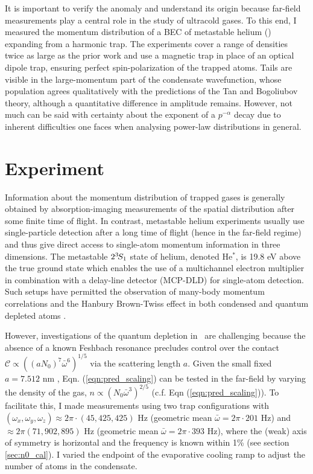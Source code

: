 	It is important to verify the anomaly and understand its origin because far-field measurements play a central role in the study of ultracold gases.
	To this end, I measured the momentum distribution of a BEC of metastable helium (\mhe) expanding from a harmonic trap. 
	The experiments cover a range of densities twice as large as the prior work and use a magnetic trap in place of an optical dipole trap, ensuring perfect spin-polarization of the trapped atoms. 
	Tails are visible in the large-momentum part of the condensate wavefunction, whose population agrees qualitatively with the predictions of the Tan and Bogoliubov theory, although a quantitative difference in amplitude remains.
	However, not much can be said with certainty about the exponent of a $p^{-\alpha}$ decay due to inherent difficulties one faces when analysing power-law distributions in general. 
	
		
	

\section{Experiment} 
	Information about the momentum distribution of trapped gases is generally obtained by absorption-imaging measurements of the spatial distribution after some finite time of flight. In contrast, metastable helium experiments usually use single-particle detection after a long time of flight (hence in the far-field regime) and thus give direct access to  single-atom momentum information in three dimensions. The metastable $2^{3\!}S_1$ state of helium, denoted He$^*$, is 19.8 eV above the true ground state \cite{Hodgman09_mhe} which enables the use of a multichannel electron multiplier in combination with a delay-line detector (MCP-DLD) \cite{Manning10} for single-atom detection. Such setups have permitted the observation of many-body momentum correlations \cite{Hodgman11,Dall13} and the Hanbury Brown-Twiss effect in both condensed \cite{Schellekens05,Jeltes07,Manning10,Dall11,Perrin07,Perrin12} and quantum depleted atoms \cite{Cayla20}. 
	
	However, investigations of the quantum depletion in \mhe~are challenging because the absence of a known Feshbach resonance precludes control over the contact $\mathcal{C}\propto((a N_0)^7\bar{\omega}^6)^{1/5}$ via the scattering length $a$. 
	Given the small fixed $a=7.512$ nm \cite{Moal06}, Eqn. (\ref{eqn:pred_scaling}) can be tested in the far-field by varying the density of the gas, $n\propto\left(N_{0}\bar{\omega}^3\right)^{2/5}$ (c.f. Eqn (\ref{eqn:pred_scaling})). 
	To facilitate this, I made measurements using two trap configurations with $(\omega_x,\omega_y,\omega_z)\approx 2\pi\cdot(45,425,425)$ Hz (geometric mean $\bar{\omega} = 2\pi \cdot201$ Hz) and 
	$\approx2\pi (71,902,895)$ Hz (geometric mean $\bar{\omega} = 2\pi \cdot393$ Hz), where the (weak) axis of symmetry is horizontal and the frequency is known within 1\% (see section \ref{sec:n0_cal}).
	I varied the endpoint of the evaporative cooling ramp to adjust the number of atoms in the condensate. 
	
